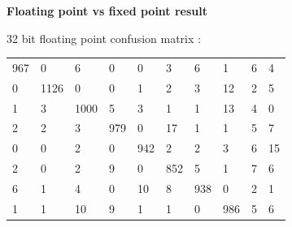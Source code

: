 \documentclass[xcolor=dvipsnames]{beamer}
\begin{document}
\begin{frame}{\bf Floating point vs fixed point result}

{\tiny
32 bit floating point confusion matrix :
\begin{table}[]
\centering
\label{my-label}
\begin{tabular}{llllllllll}
967                                     & 0                                       & 6               & 0               & 0               & 3               & 6               & 1               & 6               & 4               \\
0                                       & 1126                                    & 0               & 0               & 1               & 2               & 3               & 12              & 2               & 5               \\
1                                       & 3                                       & 1000            & 5               & 3               & 1               & 1               & 13              & 4               & 0               \\
2                                       & 2                                       & 3               & 979             & 0               & 17              & 1               & 1               & 5               & 7               \\
0                                       & 0                                       & 2               & 0               & 942             & 2               & 2               & 3               & 6               & 15              \\
2                                       & 0                                       & 2               & 9               & 0               & 852             & 5               & 1               & 7               & 6               \\
6                                       & 1                                       & 4               & 0               & 10              & 8               & 938             & 0               & 2               & 1               \\
1                                       & 1                                       & 10              & 9               & 1               & 1               & 0               & 986             & 5               & 6               \\

\end{tabular}
\end{table}}
\end{frame}
\end{document}
